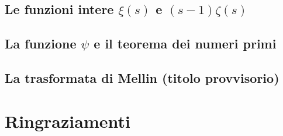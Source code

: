\documentclass{article}
\begin{document}
\subsection{Le funzioni intere $\xi(s)$ e $(s-1)\zeta(s)$}


\subsection{La funzione $\psi$ e il teorema dei numeri primi}



\subsection{La trasformata di Mellin (titolo provvisorio)}


\newpage



\section*{Ringraziamenti}

\end{document}
